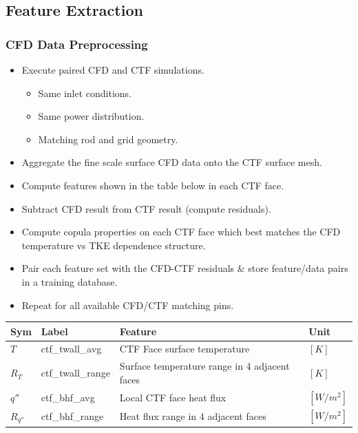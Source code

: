\documentclass[t, pdftex]{beamer}
\begin{document}
\subsection*{Feature Extraction}
\begin{frame}
\frametitle{CFD Data Preprocessing}
\vspace{-20pt}
\scriptsize{
\begin{itemize}
    \item Execute paired CFD and CTF simulations.
    \begin{itemize}
        \item Same inlet conditions.
        \item Same power distribution.
        \item Matching rod and grid geometry.
    \end{itemize}
    \item Aggregate the fine scale surface CFD data onto the CTF surface mesh.
    \item Compute features shown in the table below in each CTF face.
    \item Subtract CFD result from CTF result (compute residuals).
    \item Compute copula properties on each CTF face which best matches the CFD temperature vs TKE dependence structure.
    \item Pair each feature set with the CFD-CTF residuals \& store feature/data pairs in a training database.
    \item Repeat for all available CFD/CTF matching pins.
\end{itemize}
}
\vspace{-8pt}
\begin{table}[h]
    \begin{center}
        \tiny
        \begin{tabular}[h]{|l | l | l | l |}
            \hline
            Sym & Label & Feature & Unit \\
            \hline
            \hline
            $T$ & ctf\_twall\_avg & CTF Face surface temperature & $[K]$ \\
            $R_T$ & ctf\_twall\_range & Surface temperature range in 4 adjacent faces & $[K]$ \\
            $q''$ & ctf\_bhf\_avg & Local CTF face heat flux & $[W/m^2]$ \\
            $R_{q''}$ & ctf\_bhf\_range & Heat flux range in 4 adjacent faces & $[W/m^2]$ \\

\end{tabular}
\end{center}
\end{table}
\end{frame}
\end{document}
